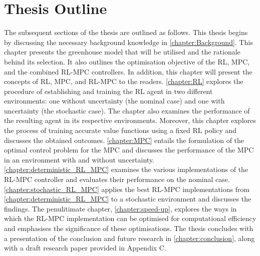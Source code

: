 \section{Thesis Outline}
The subsequent sections of the thesis are outlined as follows. This thesis begins by discussing the necessary background knowledge in \autoref{chapter:Background}.  This chapter presents the greenhouse model that will be utilised and the rationale behind its selection. It also outlines the optimisation objective of the RL, MPC, and the combined RL-MPC controllers. In addition, this chapter will present the concepts of RL, MPC, and RL-MPC to the readers. \autoref{chapter:RL} explores the procedure of establishing and training the RL agent in two different environments: one without uncertainty (the nominal case) and one with uncertainty (the stochastic case). The chapter also examines the performance of the resulting agent in its respective environments. Moreover, this chapter explores the process of training accurate value functions using a fixed RL policy and discusses the obtained outcomes. \autoref{chapter:MPC} entails the formulation of the optimal control problem for the MPC and discusses the performance of the MPC in an environment with and without uncertainty. \autoref{chapter:deterministic_RL_MPC} examines the various implementations of the RL-MPC controller and evaluates their performance on the nominal case. \autoref{chapter:stochastic_RL_MPC} applies the best RL-MPC implementations from \autoref{chapter:deterministic_RL_MPC} to a stochastic environment and discusses the findings. The penulitimate chapter, \autoref{chapter:speed-up}, explores the ways in which the RL-MPC implementation can be optimised for computational efficiency and emphasises the significance of these optimisations. The thesis concludes with a presentation of the conclusion and future research in \autoref{chapter:conclusion}, along with a draft research paper provided in Appendix C.

